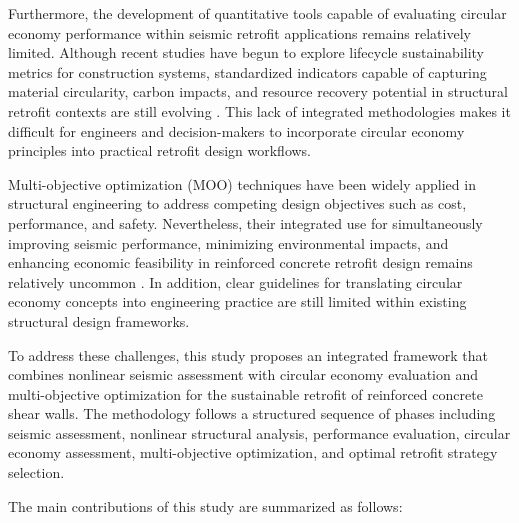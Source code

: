 \documentclass[fleqn,10pt]{wlscirep}
\begin{document}
Furthermore, the development of quantitative tools capable of evaluating circular
economy performance within seismic retrofit applications remains relatively
limited. Although recent studies have begun to explore lifecycle sustainability
metrics for construction systems, standardized indicators capable of capturing
material circularity, carbon impacts, and resource recovery potential in
structural retrofit contexts are still evolving
\cite{Goncalves2025,Poolsawad2023,PinedaMartos2024}. This lack of integrated
methodologies makes it difficult for engineers and decision-makers to incorporate
circular economy principles into practical retrofit design workflows.

Multi-objective optimization (MOO) techniques have been widely applied in
structural engineering to address competing design objectives such as cost,
performance, and safety. Nevertheless, their integrated use for simultaneously
improving seismic performance, minimizing environmental impacts, and enhancing
economic feasibility in reinforced concrete retrofit design remains relatively
uncommon \cite{Zou2007,Choi2014,Cere2022,Ahmed2025}. In addition, clear guidelines
for translating circular economy concepts into engineering practice are still
limited within existing structural design frameworks.

To address these challenges, this study proposes an integrated framework that
combines nonlinear seismic assessment with circular economy evaluation and
multi-objective optimization for the sustainable retrofit of reinforced concrete
shear walls. The methodology follows a structured sequence of phases including
seismic assessment, nonlinear structural analysis, performance evaluation,
circular economy assessment, multi-objective optimization, and optimal retrofit
strategy selection.

The main contributions of this study are summarized as follows:
\end{document}
